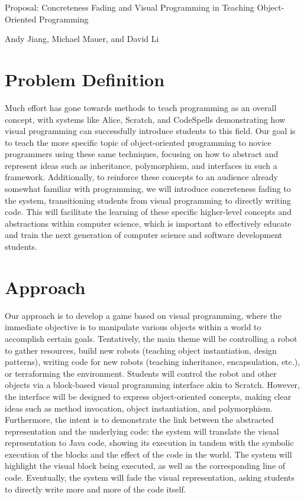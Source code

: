 \documentclass[12pt,notitlepage]{article}
\begin{document}
\begingroup
  \centering
  {\Large Proposal: Concreteness Fading and Visual Programming in
  Teaching Object-Oriented Programming\\[1em]}

  Andy Jiang, Michael Mauer, and David Li\par
\endgroup

\section{Problem Definition}

Much effort has gone towards methods to teach programming as an
overall concept, with systems like Alice, Scratch, and CodeSpells
demonstrating how visual programming can successfully introduce
students to this field. Our goal is to teach the more specific topic
of object-oriented programming to novice programmers using these same
techniques, focusing on how to abstract and represent ideas such as
inheritance, polymorphism, and interfaces in such a framework.
Additionally, to reinforce these concepts to an audience already
somewhat familiar with programming, we will introduce concreteness
fading to the system, transitioning students from visual programming
to directly writing code. This will facilitate the learning of these
specific higher-level concepts and abstractions within computer
science, which is important to effectively educate and train the next
generation of computer science and software development students.

\section{Approach}

Our approach is to develop a game based on visual programming, where
the immediate objective is to manipulate various objects within a
world to accomplish certain goals. Tentatively, the main theme will be
controlling a robot to gather resources, build new robots (teaching
object instantiation, design patterns), writing code for new robots
(teaching inheritance, encapsulation, etc.), or terraforming the
environment. Students will control the robot and other objects via a
block-based visual programming interface akin to Scratch.  However,
the interface will be designed to express object-oriented concepts,
making clear ideas such as method invocation, object instantiation,
and polymorphism. Furthermore, the intent is to demonstrate the link
between the abstracted representation and the underlying code: the
system will translate the visual representation to Java code, showing
its execution in tandem with the symbolic execution of the blocks and
the effect of the code in the world. The system will highlight the
visual block being executed, as well as the corresponding line of
code. Eventually, the system will fade the visual representation,
asking students to directly write more and more of the code itself.
\end{document}
